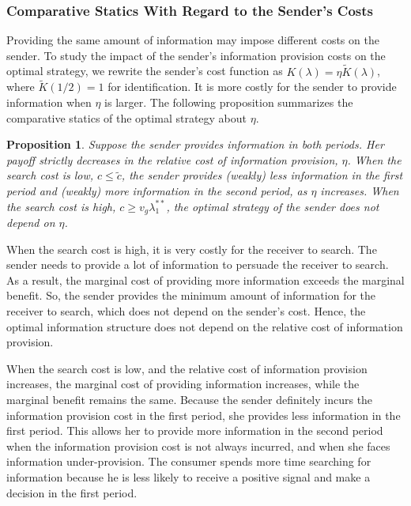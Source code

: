 \documentclass[11pt]{extarticle}
\newtheorem{proposition}{Proposition}
\begin{document}
\subsubsection{Comparative Statics With Regard to the Sender's Costs}
Providing the same amount of information may impose different costs on the sender. To study the impact of the sender's information provision costs on the optimal strategy, we rewrite the sender's cost function as $K(\lambda) = \eta \tilde{K}(\lambda)$, where $\tilde{K}(1/2) = 1$ for identification. It is more costly for the sender to provide information when $\eta$ is larger. The following proposition summarizes the comparative statics of the optimal strategy about $\eta$.

\begin{proposition}\label{cs_sender_cost}
	Suppose the sender provides information in both periods. Her payoff strictly decreases in the relative cost of information provision, $\eta$. When the search cost is low, $c \leq \tilde{c}$, the sender provides (weakly) less information in the first period and (weakly) more information in the second period, as $\eta$ increases. When the search cost is high, $c \geq v_g\lambda_1^{**}$, the optimal strategy of the sender does not depend on $\eta$.
\end{proposition}

When the search cost is high, it is very costly for the receiver to search. The sender needs to provide a lot of information to persuade the receiver to search. As a result, the marginal cost of providing more information exceeds the marginal benefit. So, the sender provides the minimum amount of information for the receiver to search, which does not depend on the sender's cost. Hence, the optimal information structure does not depend on the relative cost of information provision.

When the search cost is low, and the relative cost of information provision increases, the marginal cost of providing information increases, while the marginal benefit remains the same. Because the sender definitely incurs the information provision cost in the first period, she provides less information in the first period. This allows her to provide more information in the second period when the information provision cost is not always incurred, and when she faces information under-provision. The consumer spends more time searching for information because he is less likely to receive a positive signal and make a decision in the first period.
\end{document}
